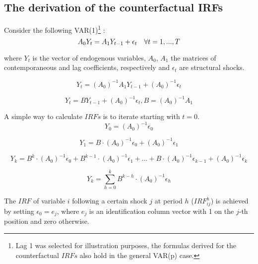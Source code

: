 \documentclass[11pt]{article}
\begin{document}
\begin{appendices}
\clearpage
\section{The derivation of the counterfactual IRFs}
\label{AppendixCountIRFsFormulas}
Consider the following VAR(1)\footnote{Lag 1 was selected for illustration purposes, the formulas derived for the counterfactual $IRFs$ also hold in the general VAR(p) case.} :
\begin{equation}
A_0Y_{t}=A_1Y_{t-1}+\epsilon_{t}  \quad \forall t=1,...,T \label{eq:model}\\
\end{equation}

where $Y_{t}$ is the vector of endogenous variables, $A_0$, $A_1$ the matrices of contemporaneous and lag coefficients, respectively and $\epsilon_{t}$ are structural shocks.

\begin{equation}
Y_{t}=(A_0)^{-1} A_1Y_{t-1}+(A_0)^{-1} \epsilon_{t}
\end{equation}

\begin{equation}
Y_{t}=BY_{t-1}+(A_0)^{-1} \epsilon_{t},  B = (A_0)^{-1} A_1
\end{equation}

A simple way to calculate $IRFs$ is to iterate starting with $t=0$.
\begin{equation}
Y_{0}=(A_0)^{-1} \epsilon_{0}
\end{equation}

\begin{equation}
Y_{1}=B \cdot (A_0)^{-1} \epsilon_{0} + (A_0)^{-1} \epsilon_{1}
\end{equation}

\begin{equation}
Y_{k}=B^k \cdot (A_0)^{-1} \epsilon_{0} + B^{k-1} \cdot (A_0)^{-1} \epsilon_{1} + ... + B \cdot (A_0)^{-1} \epsilon_{k-1} + (A_0)^{-1} \epsilon_{k}
\end{equation}

\begin{equation}
Y_{k}= \sum_{h=0}^{k} B^{k-h} \cdot (A_0)^{-1} \epsilon_{h}
\end{equation}

The $IRF$ of variable $i$ following a certain shock $j$ at period $h$ ($IRF^h_{ij}$) is achieved by setting $\epsilon_{0} = e_j$, where $e_j$ is an identification column vector with 1 on the $j$-th position and zero otherwise.\\ 


\end{appendices}
\end{document}

